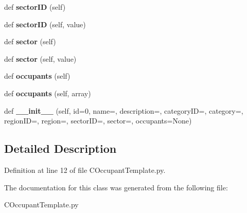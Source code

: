 \begin{DoxyCompactItemize}
\mbox{\label{class_c_occupant_template_1_1_c_occupant_template_a845d68804272d678014ec19ae4ec2bd4}} 
def {\bfseries sector\+ID} (self)
\item 
\mbox{\label{class_c_occupant_template_1_1_c_occupant_template_a39c05e74743100180589496adc2bc7f4}} 
def {\bfseries sector\+ID} (self, value)
\item 
\mbox{\label{class_c_occupant_template_1_1_c_occupant_template_ad87f4eda7b65f91e62a4fcaf83dd2a66}} 
def {\bfseries sector} (self)
\item 
\mbox{\label{class_c_occupant_template_1_1_c_occupant_template_a10757cf61e95d007399167376cc5c46d}} 
def {\bfseries sector} (self, value)
\item 
\mbox{\label{class_c_occupant_template_1_1_c_occupant_template_acc81b7a03d171885bcca403afe3e4bae}} 
def {\bfseries occupants} (self)
\item 
\mbox{\label{class_c_occupant_template_1_1_c_occupant_template_a401fc8bbb2852e9f2bfadad6c6b81a92}} 
def {\bfseries occupants} (self, array)
\item 
\mbox{\label{class_c_occupant_template_1_1_c_occupant_template_a0b6512b01e0b9f391bd9fdb046f3df0a}} 
def {\bfseries \+\_\+\+\_\+init\+\_\+\+\_\+} (self, id=0, name=\textquotesingle{}\textquotesingle{}, description=\textquotesingle{}\textquotesingle{}, category\+ID=\textquotesingle{}\textquotesingle{}, category=\textquotesingle{}\textquotesingle{}, region\+ID=\textquotesingle{}\textquotesingle{}, region=\textquotesingle{}\textquotesingle{}, sector\+ID=\textquotesingle{}\textquotesingle{}, sector=\textquotesingle{}\textquotesingle{}, occupants=None)
\end{DoxyCompactItemize}


\subsection{Detailed Description}


Definition at line 12 of file C\+Occupant\+Template.\+py.



The documentation for this class was generated from the following file\+:\begin{DoxyCompactItemize}
\item 
C\+Occupant\+Template.\+py\end{DoxyCompactItemize}
